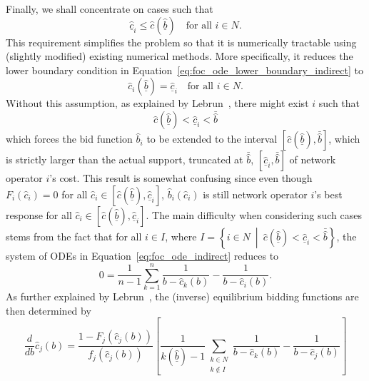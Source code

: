 Finally, we shall concentrate on cases such that
\begin{equation*}
  \underline{\hat{c}}_i \leq \hat{c}(\underline{\hat{b}}) \quad\textrm{for all } i\in N.
\end{equation*}
This requirement simplifies the problem so that it is numerically tractable using (slightly modified) existing numerical methods. More specifically, it reduces the lower boundary condition in Equation~\eqref{eq:foc_ode_lower_boundary_indirect} to
\begin{equation}
  \label{eq:foc_ode_lower_boundary_reduced_indirect}
  \hat{c}_i(\underline{\hat{b}}) = \underline{\hat{c}}_i \quad\textrm{for all } i\in N.
\end{equation}
Without this assumption, as explained by Lebrun~\cite{Lebrun2006}, there might exist $i$ such that
\begin{equation*}
  \hat{c}(\underline{\hat{b}}) < \underline{\hat{c}}_i < \bar{\hat{b}}
\end{equation*}
which forces the bid function $\hat{b}_i$ to be extended to the interval $[\hat{c}(\underline{\hat{b}}), \bar{\hat{b}}]$, which is strictly larger than the actual support, truncated at $\bar{\hat{b}}$, $[\underline{\hat{c}}_i, \bar{\hat{b}}]$ of network operator $i$'s cost. This result is somewhat confusing since even though $F_i(\hat{c}_i) = 0$ for all $\hat{c}_i\in [\hat{c}(\underline{\hat{b}}), \underline{\hat{c}}_i]$, $\hat{b}_i(\hat{c}_i)$ is still network operator $i$'s best response for all $\hat{c}_i\in [\hat{c}(\underline{\hat{b}}), \underline{\hat{c}}_i]$. The main difficulty when considering such cases stems from the fact that for all $i\in I$, where $I = \left\{i\in N \:\middle\vert\: \hat{c}(\underline{\hat{b}}) < \underline{\hat{c}}_i < \bar{\hat{b}} \right\}$, the system of ODEs in Equation~\eqref{eq:foc_ode_indirect} reduces to
\begin{equation}
  \label{eq:foc_reduced_indirect}
  0 = \frac{1}{n-1}\sum_{k=1}^{n}\frac{1}{b - \hat{c}_k(b)} - \frac{1}{b - \hat{c}_i(b)}.
\end{equation}
As further explained by Lebrun~\cite{Lebrun2006}, the (inverse) equilibrium bidding functions are then determined by
\begin{equation}
  \label{eq:foc_ode_reduced_indirect}
  \frac{d}{db}\hat{c}_j(b) = \frac{1 - F_j(\hat{c}_j(b))}{f_j(\hat{c}_j(b))} \left[ \frac{1}{k(\underline{\hat{b}}) - 1}\sum_{\substack{k\in N\\ k\not\in I}}\frac{1}{b - \hat{c}_k(b)} - \frac{1}{b - \hat{c}_j(b)}\right]
\end{equation}
